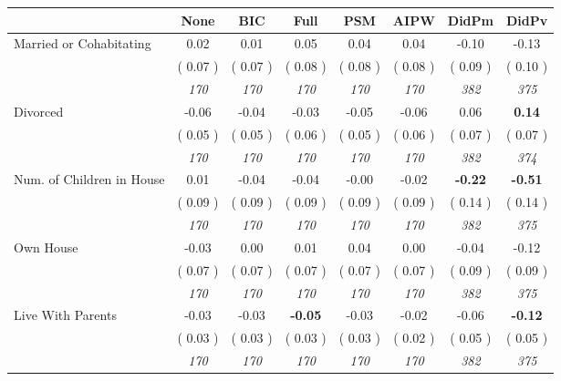 \begin{tabular}{l c c c c c c c}
\toprule
 & None & BIC & Full & PSM & AIPW & DidPm & DidPv \\
\midrule
Married or Cohabitating &      0.02 &      0.01 &      0.05 &      0.04 &      0.04 &     -0.10 &     -0.13 \\
& (     0.07 ) & (     0.07 ) & (     0.08 ) & (     0.08 ) & (     0.08 ) & (     0.09 ) & (     0.10 ) \\
& \textit{ 170 } & \textit{ 170 } & \textit{ 170 } & \textit{ 170 } & \textit{ 170 } & \textit{ 382 } & \textit{ 375 } \\
Divorced &     -0.06 &     -0.04 &     -0.03 &     -0.05 &     -0.06 &      0.06 & \textbf{      0.14 } \\
& (     0.05 ) & (     0.05 ) & (     0.06 ) & (     0.05 ) & (     0.06 ) & (     0.07 ) & (     0.07 ) \\
& \textit{ 170 } & \textit{ 170 } & \textit{ 170 } & \textit{ 170 } & \textit{ 170 } & \textit{ 382 } & \textit{ 374 } \\
Num. of Children in House &      0.01 &     -0.04 &     -0.04 &     -0.00 &     -0.02 & \textbf{     -0.22 } & \textbf{     -0.51 } \\
& (     0.09 ) & (     0.09 ) & (     0.09 ) & (     0.09 ) & (     0.09 ) & (     0.14 ) & (     0.14 ) \\
& \textit{ 170 } & \textit{ 170 } & \textit{ 170 } & \textit{ 170 } & \textit{ 170 } & \textit{ 382 } & \textit{ 375 } \\
Own House &     -0.03 &      0.00 &      0.01 &      0.04 &      0.00 &     -0.04 &     -0.12 \\
& (     0.07 ) & (     0.07 ) & (     0.07 ) & (     0.07 ) & (     0.07 ) & (     0.09 ) & (     0.09 ) \\
& \textit{ 170 } & \textit{ 170 } & \textit{ 170 } & \textit{ 170 } & \textit{ 170 } & \textit{ 382 } & \textit{ 375 } \\
Live With Parents &     -0.03 &     -0.03 & \textbf{     -0.05 } &     -0.03 &     -0.02 &     -0.06 & \textbf{     -0.12 } \\
& (     0.03 ) & (     0.03 ) & (     0.03 ) & (     0.03 ) & (     0.02 ) & (     0.05 ) & (     0.05 ) \\
& \textit{ 170 } & \textit{ 170 } & \textit{ 170 } & \textit{ 170 } & \textit{ 170 } & \textit{ 382 } & \textit{ 375 } \\
\bottomrule
\end{tabular}
